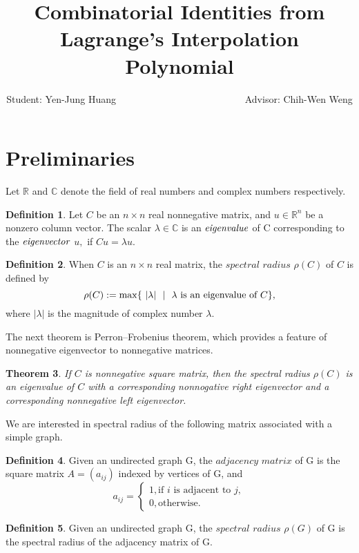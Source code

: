 \documentclass{article}
\title{Combinatorial Identities from Lagrange's Interpolation Polynomial}
\author{Student: Yen-Jung Huang  ~~~~~~~~~~~~~~~~~~~~~~~~~~Advisor: Chih-Wen Weng}
\date{} %
\theoremstyle{plain}
\newtheorem{thm}{Theorem}[section]
\theoremstyle{definition}
\newtheorem{defn}[thm]{Definition}
\begin{document}
\section{Preliminaries}
    
Let $\mathbb{R}$ and $\mathbb{C}$ denote the
 field of real numbers and complex numbers respectively.



\begin{defn}       
Let $C$ be an $n \times n$ real nonnegative matrix, and $u \in \mathbb{R}^n$ be a
 nonzero column vector. The scalar $\lambda \in \mathbb{C}$ is an $\it{eigenvalue}$ 
of C corresponding to the $\it{eigenvector}$ $u,$  if $Cu = \lambda u.$
        

\end{defn}


\begin{defn} \cite{prn_fros1}
    When $C$ is an $n \times n$ real matrix, the $\textit {spectral radius} $ $\rho(C)$
        of $C$ is defined by 
        $$\rho(C):=\max\{~|\lambda|~\ |~~\lambda\hbox{ is an eigenvalue of $C$}\},$$
    where $|\lambda|$ is the magnitude of complex number $\lambda.$
\end{defn}

    
The next theorem is Perron–Frobenius theorem, which provides a feature of
 nonnegative eigenvector to nonnegative matrices.
\begin{thm} \cite{chang} \cite{prn_fros2}
    If $C$ is nonnegative square matrix, then the spectral radius $\rho(C)$ is an
    eigenvalue of $C$ with a corresponding nonnogative right eigenvector and a
    corresponding nonnegative left eigenvector.
\end{thm}

We are interested in spectral radius of the following matrix associated with a simple graph.

\begin{defn} 
    Given an undirected graph G, the$\textit{ adjacency matrix}$ of G is the square 
    matrix $A = (a_{ij})$ indexed by vertices of G, and
     \[a_{ij} =\begin{cases} 
        1, \text{if $i$ is adjacent to $j$}, \\
        0, \text{otherwise.}
            \end{cases}
     \]
\end{defn}
    
\begin{defn}
Given an undirected graph G, the $\textit{spectral radius}$  $\rho(G) $ of G is the spectral
 radius of the adjacency matrix of G.
\end{defn}
\end{document}
